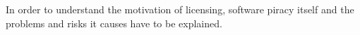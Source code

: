 In order to understand the motivation of licensing, software piracy itself and the problems and risks it causes have to be explained.
